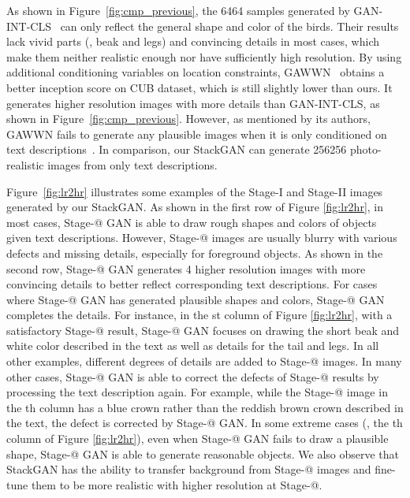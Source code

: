 \documentclass[10pt,twocolumn,letterpaper]{article}
\makeatletter
\newcommand{\Rmnum}[1]{\expandafter\@slowromancap\romannumeral #1@}
\makeatother
\begin{document}
As shown in Figure~\ref{fig:cmp_previous}, the 6464 samples generated by GAN-INT-CLS~\cite{reed2016generative} can only reflect the general shape and color of the birds. Their results lack vivid parts (\eg, beak and legs) and convincing details in most cases, which make them neither realistic enough nor have sufficiently high resolution. By using additional conditioning variables on location constraints, GAWWN~\cite{reed2016learning} obtains a better inception score on CUB dataset, which is still slightly lower than ours. It generates higher resolution images with more details than GAN-INT-CLS, as shown in Figure~\ref{fig:cmp_previous}. However, as mentioned by its authors, GAWWN fails to generate any plausible images when it is only conditioned on text descriptions~\cite{reed2016learning}. In comparison, our StackGAN can generate 256256 photo-realistic images from only text descriptions. 


Figure~\ref{fig:lr2hr} illustrates some examples of the Stage-I and Stage-II images generated by our StackGAN. As shown in the first row of Figure \ref{fig:lr2hr}, in most cases, Stage-\Rmnum{1} GAN is able to draw rough shapes and colors of objects given text descriptions. However, Stage-\Rmnum{1} images are usually blurry with various defects and missing details, especially for foreground objects. As shown in the second row, Stage-\Rmnum{2} GAN generates 4 higher resolution images with more convincing details to better reflect corresponding text descriptions. For cases where Stage-\Rmnum{1} GAN has generated plausible shapes and colors, Stage-\Rmnum{2} GAN completes the details. For instance, in the st column of Figure \ref{fig:lr2hr}, with a satisfactory Stage-\Rmnum{1} result, Stage-\Rmnum{2} GAN focuses on drawing the short beak and white color described in the text as well as details for the tail and legs. In all other examples, different degrees of details are added to Stage-\Rmnum{2} images. In many other cases, Stage-\Rmnum{2} GAN is able to correct the defects of Stage-\Rmnum{1} results by processing the text description again. For example, while the Stage-\Rmnum{1} image in the th column has a blue crown rather than the reddish brown crown described in the text, the defect is corrected by Stage-\Rmnum{2} GAN. In some extreme cases (\eg, the th column of Figure \ref{fig:lr2hr}), even when Stage-\Rmnum{1} GAN fails to draw a plausible shape, Stage-\Rmnum{2} GAN is able to generate reasonable objects. We also observe that StackGAN has the ability to transfer background from Stage-\Rmnum{1} images and fine-tune them to be more realistic with higher resolution at Stage-\Rmnum{2}.
\end{document}
